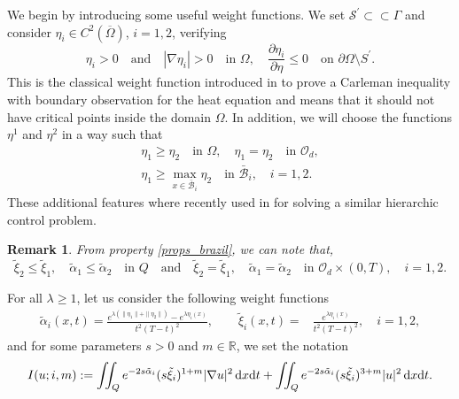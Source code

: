 \documentclass[preprint,10pt]{article}
\newtheorem{remark}[theorem]{Remark}
\numberwithin{equation}{section}
\numberwithin{theorem}{section}
\def\dx{\,\textnormal{d}x}
\def\dt{\textnormal{d}t}
\def\cbd{\Gamma}
\def\dx{\,\textnormal{d}x}
\def\dt{\textnormal{d}t}
\begin{document}
{We begin by  introducing some useful weight functions. We set $\mathcal S^\prime\subset\subset \cbd$ and consider $\eta_{i}\in C^2(\overline \Omega)$, $i=1,2$, verifying
%
\begin{equation}\label{constr_bound}
\eta_{i}>0\quad \text{and}\quad |\nabla\eta_{i}|>0 \quad \text{in } \Omega, \quad \frac{\partial\eta_{i}}{\partial \eta}\leq 0 \quad \text{on } \partial \Omega\setminus S^\prime.
\end{equation}
%
This is the classical weight function introduced in \cite[Lemma 1.2]{ima_original} to prove a Carleman inequality with boundary observation for the heat equation and means that it should not have critical points inside the domain $\Omega$. In addition, we will choose the functions $\eta^1$ and $\eta^2$ in a way such that
%
\begin{gather}\label{props_brazil}
\eta_1\geq \eta_2 \quad\text{in }\Omega, \quad\eta_1=\eta_2\quad \text{in  }\mathcal O_d, \\ \label{prop_impor}
 \eta_1\geq \max_{x\in \bar{\mathcal B}_i} \eta_2 \quad \text{in } \bar{\mathcal B}_i, \quad i=1,2.
\end{gather}
%
These additional features where recently used in \cite{da_silva} for solving a similar hierarchic control problem. 
%
\begin{remark}
From property \eqref{props_brazil}, we can note that,
\begin{equation}\label{weights_12}
\tilde{\xi}_2\leq \tilde{\xi}_1,\quad \tilde\alpha_1\leq \tilde\alpha_2\quad\text{in } Q\quad\text{and}\quad\tilde{\xi}_2= \tilde{\xi}_1,\quad \tilde\alpha_1=\tilde\alpha_2\quad\text{in } \mathcal{O}_d\times(0,T), \quad i=1,2. 
\end{equation}
\end{remark} 

For all $\lambda\geq1$, let us consider the following weight functions
%
\begin{equation}\label{pesos_boundary}
\begin{split}
\tilde{\alpha}_i(x,t)=\frac{e^{\lambda(\|\eta_1\|+\|\eta_2\|)}-e^{\lambda \eta_i(x)}}{t^2(T-t)^2}, \qquad \tilde{\xi}_i(x,t)=&\frac{e^{\lambda\eta_i(x)}}{t^2(T-t)^2}, \quad i=1,2,
\end{split}\end{equation}
%
and for some parameters $s>0$ and $m\in\mathbb R$, we set the notation
%
\begin{equation*}
I(u;i,m):=\iint_{Q}e^{-2s\tilde{\alpha}_i}(s\tilde{\xi}_i)^{1+m}|\nabla u|^2\dx\dt+\iint_{Q}e^{-2s\tilde{\alpha}_i}(s\tilde{\xi}_i)^{3+m}|u|^2\dx\dt.
\end{equation*}

}
\end{document}
